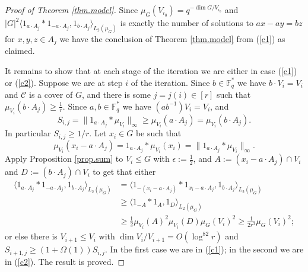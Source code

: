 \documentclass[10pt,a4paper]{amsart}
\providecommand{\F}{\mathbb{F}}
\begin{document}
\begin{proof}[Proof of Theorem \ref{thm.model}]
Since $\mu_G(V_{i_0})=q^{-\dim G/V_{i_0}}$ and $|G|^2\langle 1_{a\cdot A_j} \ast 1_{-a\cdot A_j},1_{b \cdot A_j}\rangle_{L_2(\mu_G)} $ is exactly the number of solutions to $ax-ay=bz$ for $x,y,z \in A_j$ we have the conclusion of Theorem \ref{thm.model} from (\ref{c1}) as claimed.

It remains to show that at each stage of the iteration we are either in case (\ref{c1}) or (\ref{c2}). Suppose we are at step $i$ of the iteration. Since $b \in \F_q^*$ we have $b\cdot V_i=V_i$ and $\mathcal{C}$ is a cover of $G$, and there is some $j=j(i) \in [r]$ such that $\mu_{V_i}(b\cdot A_j) \geq \frac{1}{r}$. Since $a,b \in \F_q^*$ we have $(ab^{-1})V_i=V_i$, and
\begin{equation*}
S_{i,j}=\|1_{a\cdot A_j}\ast \mu_{V_i}\|_\infty \geq \mu_{V_i}(a\cdot A_j) = \mu_{V_i}(b \cdot A_j).
\end{equation*}
In particular $S_{i,j} \geq 1/r$. Let $x_i\in G$ be such that 
\begin{equation*}
\mu_{V_i}(x_i-a \cdot A_j )=1_{a \cdot A_j} \ast \mu_{V_i}(x_i)=\|1_{a\cdot A_j}\ast \mu_{V_i}\|_\infty.
\end{equation*}
Apply Proposition \ref{prop.sum} to $V_i\leq G$ with $\epsilon:=\frac{1}{2}$, and $A:=(x_i-a \cdot A_j)\cap V_i$ and $D:=(b \cdot A_j)\cap V_i$ to get that either
\begin{align*}
\langle 1_{a \cdot A_j} \ast 1_{-a\cdot A_j}, 1_{b \cdot A_j}\rangle_{L_2(\mu_G)} & =  \langle 1_{-(x_i-a \cdot A_j)} \ast 1_{x_i-a\cdot A_j}, 1_{b \cdot A_j}\rangle_{L_2(\mu_G)}\\ &\geq \langle 1_{-A} \ast 1_{A},1_D\rangle_{L_2(\mu_{G})}\\ &\geq \frac{1}{2}\mu_{V_i}(A)^2\mu_{V_i}(D)\mu_G(V_i)^2 \geq \frac{1}{2r^3}\mu_G(V_i)^2;
\end{align*}
or else there is $V_{i+1} \leq V_i$ with $\dim V_i/V_{i+1}=O(\log^82r)$ and $S_{i+1,j} \geq (1+\Omega(1))S_{i,j}$.  In the first case we are in (\ref{c1}); in the second we are in (\ref{c2}). The result is proved.
\end{proof}
\end{document}
